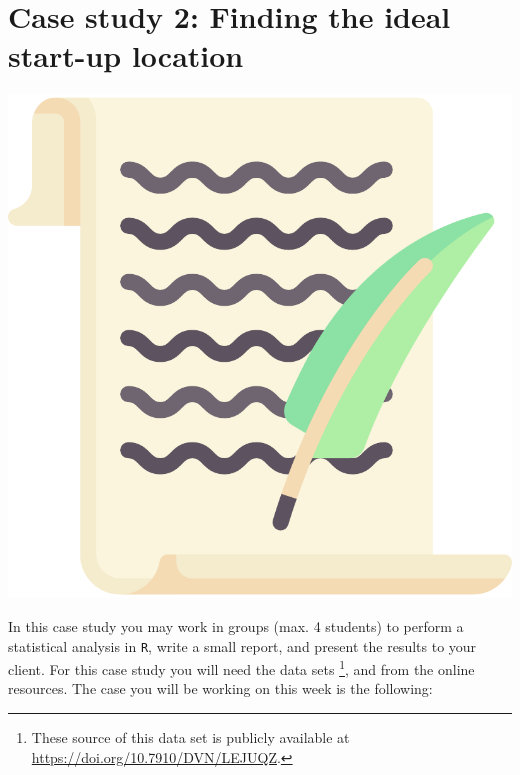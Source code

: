 
\begin{minipage}{0.8\textwidth}
\section{Case study 2: Finding the ideal start-up location}
\end{minipage}%
\hfill%
\begin{minipage}{0.1\textwidth}
\includegraphics[width=\linewidth]{Files/Images/lettericon.pdf}
\end{minipage}
\vspace*{.1cm}

In this case study you may work in groups (max. 4 students) to perform a statistical analysis in \texttt{R}, write a small report, and present the results to your client. For this case study you will need the data sets \footnote{These source of this data set is publicly available at \url{https://doi.org/10.7910/DVN/LEJUQZ}.},  and  from the online resources. The case you will be working on this week is the following: \\

